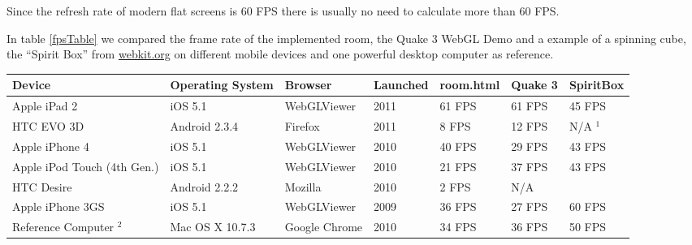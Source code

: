 \documentclass[12pt,journal,compsoc]{IEEEtran}
\begin{document}
Since the refresh rate of modern flat screens is 60 FPS there is usually no need to calculate more than 60 FPS. %

In table \ref{fpsTable} we compared the frame rate of the implemented room, the Quake 3 WebGL Demo \cite{quakewebgl} and a example of a spinning cube, the “Spirit Box” from \url {webkit.org} on different mobile devices and one powerful desktop computer as reference.

\begin{table*}[tb]
	\begin{centering}
	\begin{tabular}{l|l|l|l|l|l|l}
		Device						& Operating System	& Browser		& Launched	& room.html	& Quake 3	&	SpiritBox	\\
		\hline
		Apple iPad 2				& iOS 5.1			& WebGLViewer	& 2011		& 61 FPS	& 61 FPS	& 45 FPS		\\ %
		HTC EVO 3D					& Android 2.3.4		& Firefox		& 2011		& 8 FPS		& 12 FPS	& N/A $^{1}$	\\ 
		Apple iPhone 4				& iOS 5.1			& WebGLViewer	& 2010		& 40 FPS	& 29 FPS	& 43 FPS		\\
		Apple iPod Touch (4th Gen.)	& iOS 5.1			& WebGLViewer	& 2010		& 21 FPS	& 37 FPS	& 43 FPS		\\ %
		HTC Desire					& Android 2.2.2		& Mozilla		& 2010		& 2 FPS 	& N/A		&				\\ %
		Apple iPhone 3GS			& iOS 5.1			& WebGLViewer	& 2009		&	36 FPS		&	27 FPS	&	60 FPS			\\
		\hline
		Reference Computer $^{2}$			& 	Mac OS X 10.7.3			& 	Google Chrome	&	2010	&	34 FPS	&	36 FPS	&		50 FPS	\\
	\end{tabular}
	\caption{Frames per Second (FPS) of different WebGL applications on different devices\label{fpsTable}\\$^{1}$ \textit{The FPS value is constantly alternating between 12 FPS and 209 FPS, making it impossible to determine a realistic value.}\\$^{2}$ \textit{Reference Computer: MacBook 2010, Mac OS X 10.7.3, 2.26 GHz Intel Core 2 Duo, 4 GB 1067 MHz DDR3 RAM}}
	\end{centering}
\end{table*}
\end{document}
